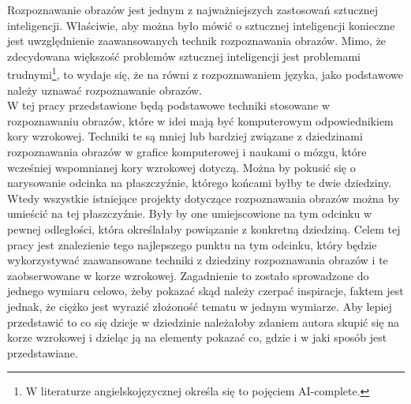 Rozpoznawanie obrazów jest jednym z najważniejszych zastosowań sztucznej inteligencji. Właściwie, aby można było mówić o sztucznej inteligencji konieczne jest uwzględnienie zaawansowanych technik rozpoznawania obrazów. Mimo, że zdecydowana większość problemów sztucznej inteligencji jest problemami trudnymi\footnote{W literaturze angielskojęzycznej określa się to pojęciem AI-complete.}, to wydaje się, że na równi z rozpoznawaniem języka, jako podstawowe należy uznawać rozpoznawanie obrazów.\\

W tej pracy przedstawione będą podstawowe techniki stosowane w rozpoznawaniu obrazów, które w idei mają być komputerowym odpowiednikiem kory wzrokowej. Techniki te są mniej lub bardziej związane z dziedzinami rozpoznawania obrazów w grafice komputerowej i naukami o mózgu, które wcześniej wspomnianej kory wzrokowej dotyczą. Można by pokusić się o narysowanie odcinka na płaszczyźnie, którego końcami byłby te dwie dziedziny. Wtedy wszystkie istniejące projekty dotyczące rozpoznawania obrazów można by umieścić na tej płaszczyźnie. Były by one umiejscowione na tym odcinku w pewnej odległości, która określałaby powiązanie z konkretną dziedziną. Celem tej pracy jest znalezienie tego najlepszego punktu na tym odcinku, który będzie wykorzystywać zaawansowane techniki z dziedziny rozpoznawania obrazów i te zaobserwowane w korze wzrokowej. Zagadnienie to zostało sprowadzone do jednego wymiaru celowo, żeby pokazać skąd należy czerpać inspiracje, faktem jest jednak, że ciężko jest wyrazić złożoność tematu w jednym wymiarze. Aby lepiej przedstawić to co się dzieje w dziedzinie należałoby zdaniem autora skupić się na korze wzrokowej i dzieląc ją na elementy pokazać co, gdzie i w jaki sposób jest przedstawiane.
